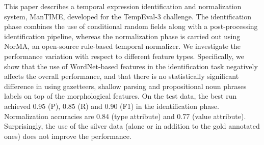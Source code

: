 This paper describes a temporal expression identification and normalization system, ManTIME, developed for the TempEval-3 challenge. The identification
 phase combines the use of conditional random fields along with a
 post-processing identification pipeline, whereas the normalization phase is
 carried out using NorMA, an open-source rule-based temporal normalizer. We
 investigate the performance variation with respect to different feature types.
 Specifically, we show that the use of WordNet-based features in the
 identification task negatively affects the overall performance, and that there
 is no statistically significant difference in using gazetteers, shallow parsing
 and propositional noun phrases labels on top of the morphological features. On
 the test data, the best run achieved 0.95 (P), 0.85 (R) and 0.90 (F1) in the
 identification phase. Normalization accuracies are 0.84 (type attribute) and
 0.77 (value attribute). Surprisingly, the use of the silver data (alone or in
 addition to the gold annotated ones) does not improve the performance.


